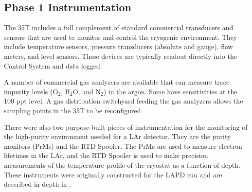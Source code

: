 



\subsection {Phase 1 Instrumentation}

The 35T includes a full complement of standard commercial transducers and sensors that are used to 
monitor and control the cryogenic environment. They include temperature sensors, pressure transducers 
(absolute and gauge), flow meters, and level sensors. These devices are typically readout directly into the 
Control System and data logged. 

A number of commercial gas analyzers are available that can measure trace impurity levels (O$_2$, H$_2$O, and 
N$_2$) in the argon. Some have sensitivities at the 100 ppt level. A gas distribution switchyard feeding the 
gas analyzers allows the sampling points in the 35T to be reconfigured.

There were also two purpose-built pieces of instrumentation for the monitoring of the high-purity 
environment needed for a LAr detector. They are the purity monitors (PrMs) and the RTD Spooler. The 
PrMs are used to measure electron lifetimes in the LAr, and the RTD Spooler is used to make precision 
measurements of the temperature profile of the cryostat as a function of depth.  These instruments were 
originally constructed for the LAPD run and are described in depth in \cite{bib:lapdP07005}.

